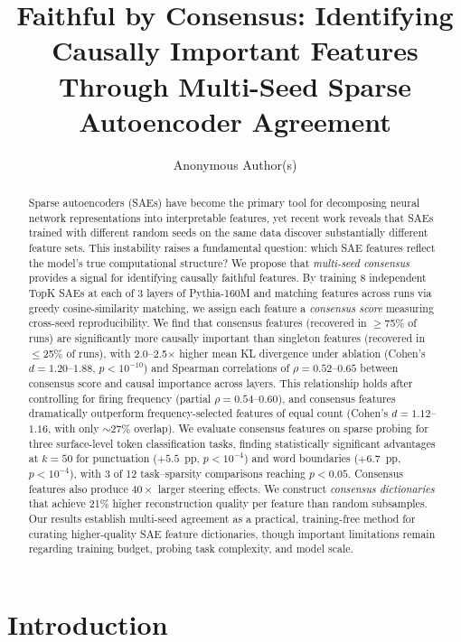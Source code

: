 \documentclass{article}
\title{Faithful by Consensus: Identifying Causally Important Features\\Through Multi-Seed Sparse Autoencoder Agreement}
\author{
  Anonymous Author(s)
}
\begin{document}
\maketitle

\begin{abstract}
Sparse autoencoders (SAEs) have become the primary tool for decomposing neural network representations into interpretable features, yet recent work reveals that SAEs trained with different random seeds on the same data discover substantially different feature sets. This instability raises a fundamental question: which SAE features reflect the model's true computational structure? We propose that \emph{multi-seed consensus} provides a signal for identifying causally faithful features. By training 8 independent TopK SAEs at each of 3 layers of Pythia-160M and matching features across runs via greedy cosine-similarity matching, we assign each feature a \emph{consensus score} measuring cross-seed reproducibility. We find that consensus features (recovered in $\geq$75\% of runs) are significantly more causally important than singleton features (recovered in $\leq$25\% of runs), with 2.0--2.5$\times$ higher mean KL divergence under ablation (Cohen's $d = 1.20$--$1.88$, $p < 10^{-10}$) and Spearman correlations of $\rho = 0.52$--$0.65$ between consensus score and causal importance across layers. This relationship holds after controlling for firing frequency (partial $\rho = 0.54$--$0.60$), and consensus features dramatically outperform frequency-selected features of equal count (Cohen's $d = 1.12$--$1.16$, with only $\sim$27\% overlap). We evaluate consensus features on sparse probing for three surface-level token classification tasks, finding statistically significant advantages at $k{=}50$ for punctuation ($+5.5$~pp, $p < 10^{-4}$) and word boundaries ($+6.7$~pp, $p < 10^{-4}$), with 3 of 12 task--sparsity comparisons reaching $p < 0.05$. Consensus features also produce $40\times$ larger steering effects. We construct \emph{consensus dictionaries} that achieve 21\% higher reconstruction quality per feature than random subsamples. Our results establish multi-seed agreement as a practical, training-free method for curating higher-quality SAE feature dictionaries, though important limitations remain regarding training budget, probing task complexity, and model scale.
\end{abstract}

\section{Introduction}
\end{document}
